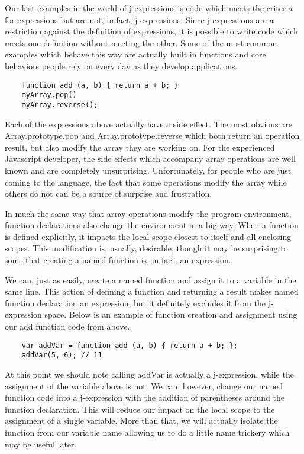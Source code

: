 \documentclass[a4paper,12pt,twoside]{book}
\begin{document}
 Our last examples in the world of j-expressions is code which meets the criteria for expressions but are not, in fact, j-expressions.  Since j-expressions are a restriction against the definition of expressions, it is possible to write code which meets one definition without meeting the other. Some of the most common examples which behave this way are actually built in functions and core behaviors people rely on every day as they develop applications.
 
\begin{lstlisting}
    function add (a, b) { return a + b; }
    myArray.pop()
    myArray.reverse();
\end{lstlisting}
 
 Each of the expressions above actually have a side effect. The most obvious are Array.prototype.pop and Array.prototype.reverse which both return an operation result, but also modify the array they are working on.  For the experienced Javascript developer, the side effects which accompany array operations are well known and are completely unsurprising. Unfortunately, for people who are just coming to the language, the fact that some operations modify the array while others do not can be a source of surprise and frustration.
 
 In much the same way that array operations modify the program environment, function declarations also change the environment in a big way. When a function is defined explicitly, it impacts the local scope closest to itself and all enclosing scopes. This modification is, usually, desirable, though it may be surprising to some that creating a named function is, in fact, an expression.
 
 We can, just as easily, create a named function and assign it to a variable in the same line. This action of defining a function and returning a result makes named function declaration an expression, but it definitely excludes it from the j-expression space.  Below is an example of function creation and assignment using our add function code from above.

\begin{lstlisting}
    var addVar = function add (a, b) { return a + b; };
    addVar(5, 6); // 11
\end{lstlisting}
 
 At this point we should note calling addVar is actually a j-expression, while the assignment of the variable above is not. We can, however, change our named function code into a j-expression with the addition of parentheses around the function declaration.  This will reduce our impact on the local scope to the assignment of a single variable.  More than that, we will actually isolate the function from our variable name allowing us to do a little name trickery which may be useful later.
 
\end{document}

